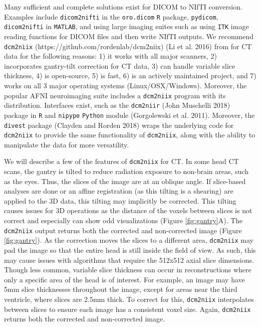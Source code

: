 \documentclass[]{elsarticle} %
\begin{document}
Many sufficient and complete solutions exist for DICOM to NIfTI conversion. Examples include \texttt{dicom2nifti} in the \texttt{oro.dicom} \texttt{R} package, \texttt{pydicom}, \texttt{dicom2nifti} in \texttt{MATLAB}, and using large imaging suites such as using \texttt{ITK} image reading functions for DICOM files and then write NIfTI outputs. We recommend \texttt{dcm2niix} (https://github.com/rordenlab/dcm2niix) (Li et al. 2016) from for CT data for the following reasons: 1) it works with all major scanners, 2) incorporates gantry-tilt correction for CT data, 3) can handle variable slice thickness, 4) is open-source, 5) is fast, 6) is an actively maintained project, and 7) works on all 3 major operating systems (Linux/OSX/Windows). Moreover, the popular AFNI neuroimaging suite includes a \texttt{dcm2niix} program with its distribution. Interfaces exist, such as the \texttt{dcm2niir} (John Muschelli 2018) package in \texttt{R} and \texttt{nipype} \texttt{Python} module (Gorgolewski et al. 2011). Moreover, the \texttt{divest} package (Clayden and Rorden 2018) wraps the underlying code for \texttt{dcm2niix} to provide the same functionality of \texttt{dcm2niix}, along with the ability to manipulate the data for more versatility.

We will describe a few of the features of \texttt{dcm2niix} for CT. In some head CT scans, the gantry is tilted to reduce radiation exposure to non-brain areas, such as the eyes. Thus, the slices of the image are at an oblique angle. If slice-based analyses are done or an affine registration (as this tilting is a shearing) are applied to the 3D data, this tilting may implicitly be corrected. This tilting causes issues for 3D operations as the distance of the voxels between slices is not correct and especially can show odd visualizations (Figure \ref{fig:gantry}A). The \texttt{dcm2niix} output returns both the corrected and non-corrected image (Figure \ref{fig:gantry}). As the correction moves the slices to a different area, \texttt{dcm2niix} may pad the image so that the entire head is still inside the field of view. As such, this may cause issues with algorithms that require the 512x512 axial slice dimensions. Though less common, variable slice thickness can occur in reconstructions where only a specific area of the head is of interest. For example, an image may have 5mm slice thicknesses throughout the image, except for areas near the third ventricle, where slices are 2.5mm thick. To correct for this, \texttt{dcm2niix} interpolates between slices to ensure each image has a consistent voxel size. Again, \texttt{dcm2niix} returns both the corrected and non-corrected image.
\end{document}
